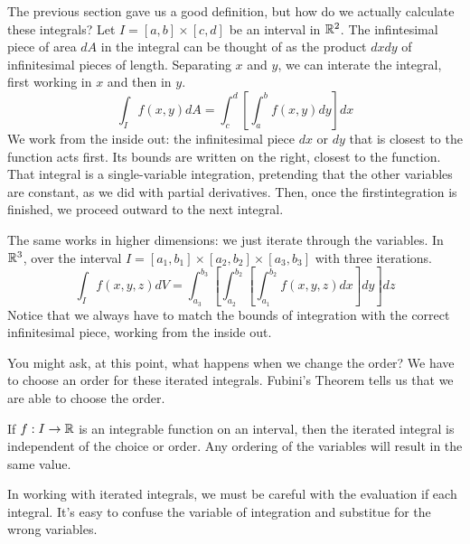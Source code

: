 \documentclass[fleqn,letterpaper]{report}
\begin{document}
The previous section gave us a good definition, but how do we
actually calculate these integrals? Let $I = [a,b] \times
[c,d]$ be an interval in $\mathbb{R}^2$. The
infintesimal piece of area $dA$ in the integral can be thought
of as the product $dx dy$ of infinitesimal pieces of
length. Separating $x$ and $y$, we can interate the
integral, first working in $x$ and then in $y$.
\begin{equation*}
\int_{I} f(x,y) dA = \int_c^d \left[ \int_a^b f(x,y) dy
\right] dx
\end{equation*}
We work from the inside out: the infinitesimal piece $dx$ or
$dy$ that is closest to the function acts first. Its bounds
are written on the right, closest to the function. That
integral is a single-variable integration, pretending that the
other variables are constant, as we did with partial
derivatives. Then, once the firstintegration is finished, we
proceed outward to the next integral.

The same works in higher dimensions: we just iterate through
the variables. In $\mathbb{R}^3$, over the interval $I = [a_1,b_1]
\times [a_2,b_2] \times [a_3,b_3]$ with three iterations.
\begin{equation*}
\int_{I} f(x,y,z) dV = \int_{a_3}^{b_3} \left[
\int_{a_2}^{b_2} \left[ \int_{a_1}^{b_2} f(x,y,z) dx \right] dy
\right] dz
\end{equation*}
Notice that we always have to match the bounds of
integration with the correct infinitesimal piece, working from
the inside out.

You might ask, at this point, what happens when we change the
order? We have to choose an order for these iterated
integrals. Fubini's Theorem tells us that we are able to
choose the order.

\begin{thm}
\label{thm-fubini}
If $f: I \rightarrow \mathbb{R}$ is an integrable function on an
interval, then the iterated integral is independent of the
choice or order. Any ordering of the variables will result in
the same value.
\end{thm}

In working with iterated integrals, we must be careful with
the evaluation if each integral. It's easy to confuse the
variable of integration and substitue for the wrong variables.
\end{document}
